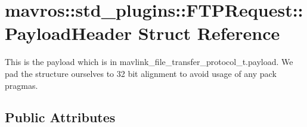 \hypertarget{structmavros_1_1std__plugins_1_1FTPRequest_1_1PayloadHeader}{}\section{mavros\+::std\+\_\+plugins\+::F\+T\+P\+Request\+::Payload\+Header Struct Reference}
\label{structmavros_1_1std__plugins_1_1FTPRequest_1_1PayloadHeader}


This is the payload which is in mavlink\+\_\+file\+\_\+transfer\+\_\+protocol\+\_\+t.\+payload. We pad the structure ourselves to 32 bit alignment to avoid usage of any pack pragmas.  


\subsection*{Public Attributes}
